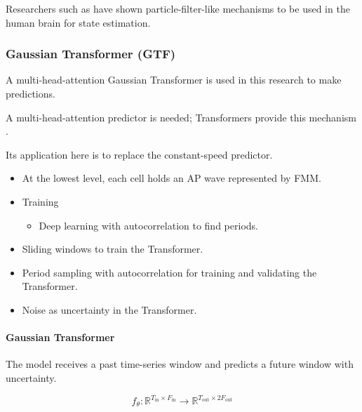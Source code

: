 \documentclass[a4paper]{article}
\begin{document}
            Researchers such as \cite{kutschireiter-2017-nonlinear-bayesian-filtering-and-learning-a-neuronal-dynamics-for-perception} have shown particle-filter-like mechanisms to be used in the human brain for state estimation.


         \subsubsection{Gaussian Transformer (GTF)} \label{guassian_tranfsomrer}
            A multi-head-attention Gaussian Transformer is used in this research to make predictions.

            A multi-head-attention predictor is needed; Transformers provide this mechanism \cite{vaswani-2017-attention-is-all-you-need}.

            Its application here is to replace the constant-speed predictor.



            \begin{itemize}
               \item At the lowest level, each cell holds an AP wave represented by FMM.
               \item Training
               \begin{itemize}
                  \item Deep learning with autocorrelation to find periods.
               \end{itemize}
               \item Sliding windows to train the Transformer.
               \item Period sampling with autocorrelation for training and validating the Transformer.
               \item Noise as uncertainty in the Transformer.

            \end{itemize}
            \paragraph{Gaussian Transformer}
               The model receives a past time-series window and predicts a future window with uncertainty.



               \[
               f_{\theta}:
               \mathbb{R}^{T_{\mathrm{in}} \times F_{\mathrm{in}}}
               \rightarrow
               \mathbb{R}^{T_{\mathrm{out}} \times 2F_{\mathrm{out}}}
               \]
\end{document}
